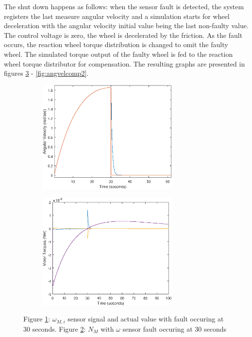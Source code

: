 The shut down happens as follows: when the sensor fault is detected, the system registers the last measure angular velocity and a simulation starts for wheel deceleration with the angular velocity initial value being the last non-faulty value. The control voltage is zero, the wheel is decelerated by the friction. As the fault occurs, the reaction wheel torque distribution is changed to omit the faulty wheel. The simulated torque output of the faulty wheel is fed to the reaction wheel torque distributor for compensation. The resulting graphs are presented in figures \ref{fig:angvelcomp1} - \ref{fig:angvelcomp2}.


\begin{figure}[H]
	\centering
	\begin{subfigure}{.5\textwidth}
	\centering
	\includegraphics[width=70mm]{figures/omegaSensorfault_omega}
	\caption{}
	\label{fig:sub1}
	\end{subfigure}%
	\begin{subfigure}{.5\textwidth}
	\centering
	\includegraphics[width=70mm]{figures/omegaSensorfault_Nmotor}
	\caption{}
	\label{fig:sub2}
	\end{subfigure}
	\caption{Figure \ref{fig:sub1}: $\omega_{M,i}$ sensor signal and actual value with fault occuring at 30 seconds. Figure \ref{fig:sub2}: $N_M$ with $\omega$ sensor fault occuring at 30 seconds}
	\label{fig:angvelcomp1}
\end{figure}

